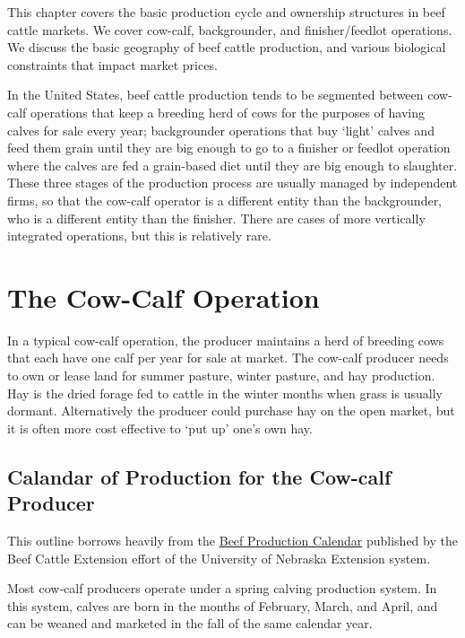 \documentclass[
  letterpaper,
  DIV=11,
  numbers=noendperiod]{scrreprt}
\begin{document}
This chapter covers the basic production cycle and ownership structures
in beef cattle markets. We cover cow-calf, backgrounder, and
finisher/feedlot operations. We discuss the basic geography of beef
cattle production, and various biological constraints that impact market
prices.

In the United States, beef cattle production tends to be segmented
between cow-calf operations that keep a breeding herd of cows for the
purposes of having calves for sale every year; backgrounder operations
that buy `light' calves and feed them grain until they are big enough to
go to a finisher or feedlot operation where the calves are fed a
grain-based diet until they are big enough to slaughter. These three
stages of the production process are usually managed by independent
firms, so that the cow-calf operator is a different entity than the
backgrounder, who is a different entity than the finisher. There are
cases of more vertically integrated operations, but this is relatively
rare.

\hypertarget{the-cow-calf-operation}{%
\section{The Cow-Calf Operation}\label{the-cow-calf-operation}}

In a typical cow-calf operation, the producer maintains a herd of
breeding cows that each have one calf per year for sale at market. The
cow-calf producer needs to own or lease land for summer pasture, winter
pasture, and hay production. Hay is the dried forage fed to cattle in
the winter months when grass is usually dormant. Alternatively the
producer could purchase hay on the open market, but it is often more
cost effective to `put up' one's own hay.

\hypertarget{calandar-of-production-for-the-cow-calf-producer}{%
\subsection{Calandar of Production for the Cow-calf
Producer}\label{calandar-of-production-for-the-cow-calf-producer}}

This outline borrows heavily from the
\href{http://beef.unl.edu/beefprodcal.shtml}{Beef Production Calendar}
published by the Beef Cattle Extension effort of the University of
Nebraska Extension system.

Most cow-calf producers operate under a spring calving production
system. In this system, calves are born in the months of February,
March, and April, and can be weaned and marketed in the fall of the same
calendar year.
\end{document}
